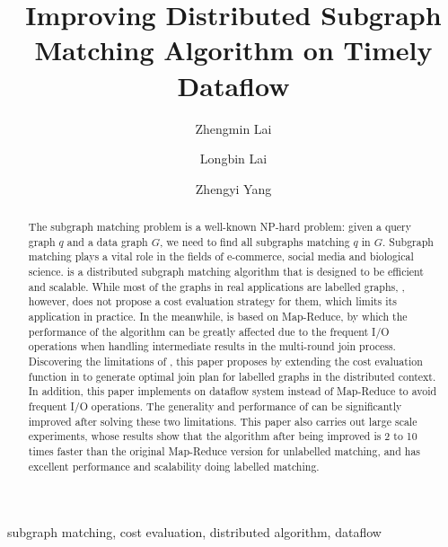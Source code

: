 \documentclass[conference]{IEEEtran}
\begin{document}
\title{Improving Distributed Subgraph Matching Algorithm on Timely Dataflow}

\author[1]{Zhengmin Lai}
\author[2]{Longbin Lai}
\author[2]{Zhengyi Yang}

\maketitle

\begin{abstract}
The subgraph matching problem is a well-known NP-hard problem: given a query graph $q$ and a data graph $G$, we need to find all subgraphs matching $q$ in $G$. Subgraph matching plays a vital role in the fields of e-commerce, social media and biological science. \cliquejoin is a distributed subgraph matching algorithm that is designed to be efficient and scalable. While most of the graphs in real applications are labelled graphs, \cliquejoin, however, does not propose a cost evaluation strategy for them, which limits its application in practice. In the meanwhile, \cliquejoin is based on Map-Reduce, by which the performance of the algorithm can be greatly affected due to the frequent I/O operations when handling intermediate results in the multi-round join process. Discovering the limitations of \cliquejoin, this paper proposes \gencliqjoin by extending the cost evaluation function in \cliquejoin to generate optimal join plan for labelled graphs in the distributed context. In addition, this paper implements \gencliqjoin on \timely dataflow system instead of Map-Reduce to avoid frequent I/O operations. The generality and performance of \cliquejoin can be significantly improved after solving these two limitations. This paper also carries out large scale experiments, whose results show that the algorithm after being improved is 2 to 10 times faster than the original Map-Reduce version for unlabelled matching, and has excellent performance and scalability doing labelled matching.
\end{abstract}

\begin{IEEEkeywords}
 subgraph matching, cost evaluation, distributed algorithm, dataflow
\end{IEEEkeywords}















\end{document}
